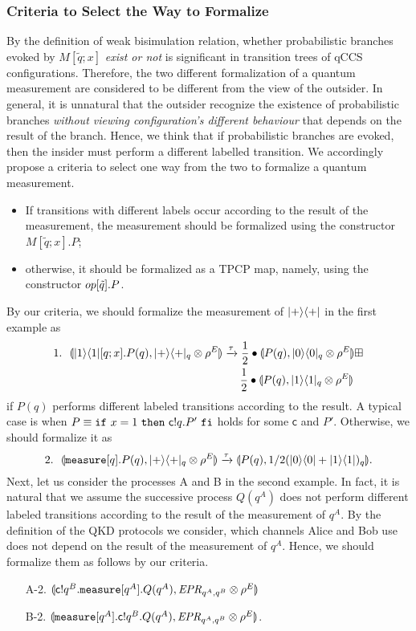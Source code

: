 \subsubsection*{Criteria to Select the Way to Formalize}
\label{symqccs:criteria}
By the definition of weak bisimulation relation,
whether probabilistic branches
evoked by $M[\tilde q;x]$ \emph{exist or not} is
significant in transition trees of qCCS configurations.
Therefore, the two different formalization of a
quantum measurement are considered to be 
different from the view of the outsider.
In general, it is unnatural that the outsider recognize
the existence of probabilistic branches {\it without viewing
configuration's different behaviour} that depends on 
the result of the branch.
Hence, we think that if probabilistic branches are evoked, then
the insider must perform a different labelled transition.
We accordingly propose a criteria to select one way from the two to
formalize a quantum measurement.
\begin{itemize}
 \item If transitions with different labels occur according to
       the result of the measurement, the measurement should be formalized
       using the constructor $M[\tilde q;x].P$;
 \item otherwise, it should be formalized
       as a TPCP map, namely, using the constructor $op[\tilde
       q].P$.
\end{itemize}
By our criteria, we should formalize the measurement of $|+\rangle\langle +|$
in the first example as
\begin{align*}
  &1.~~\llparenthesis |1\rangle\langle 1|[q;x].P(q), |+\rangle\langle +|_q \otimes \rho^E \rrparenthesis
  \xrightarrow{\tau}
  \frac{1}{2} \bullet \llparenthesis P(q), |0\rangle\langle 0|_q \otimes \rho^E \rrparenthesis \boxplus\\
  &~~~~~~~~~~~~~~~~~~~~~~~~~~~~~~~~~~~~~~~~~~~~~~~~~~
  \frac{1}{2} \bullet \llparenthesis P(q), |1\rangle\langle 1|_q \otimes \rho^E \rrparenthesis
\end{align*}
if $P(q)$ performs different labeled transitions according to the
result. A typical case is when $P \equiv \mathtt{if}~x =
1~\mathtt{then}~\mathsf{c}! q.P'~\mathtt{fi}$ holds for some $\mathsf{c}$ and $P'$.
Otherwise, we should formalize it as
\[
 2.~~\llparenthesis \mathtt{measure}[q].P(q), |+\rangle\langle +|_q \otimes \rho^E \rrparenthesis
  \xrightarrow{\tau}
  \llparenthesis P(q), 1/2(|0\rangle\langle 0|+|1\rangle\langle 1|)_q \rrparenthesis.
\]
Next, let us consider the processes A and B in the second example.
In fact, it is natural that we assume the successive process $Q(q^A)$
does not perform different labeled transitions according to the result of
the measurement of $q^A$. By the definition of the QKD protocols we
consider, which channels Alice and Bob use does not depend on
the result of the measurement of $q^A$.
Hence, we should formalize them as follows by our
criteria.
\begin{enumerate}
 \item[A-2.] $\llparenthesis 
       \mathsf{c}! q^B. {\tt measure}[q^A].Q(q^A)
       , 
       \mathit{EPR}_{q^A, q^B} \otimes \rho^E
        \rrparenthesis$
 \item[B-2.] $\llparenthesis 
        {\tt measure}[q^A]. \mathsf{c}! q^B.Q(q^A)
       , 
       \mathit{EPR}_{q^A, q^B} \otimes \rho^E
        \rrparenthesis$.
\end{enumerate}

